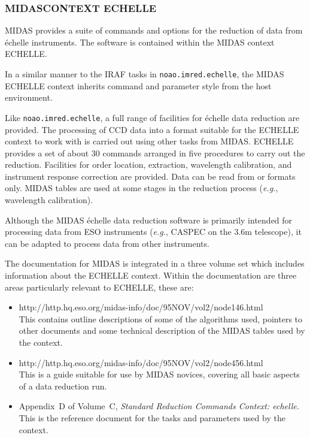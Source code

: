 \subsubsection{\label{se_midas_ech}MIDAS\sgspec{---}{ - }CONTEXT ECHELLE}

 MIDAS provides a suite of commands and
options for the reduction of data from \'{e}chelle instruments.
The software is contained within the MIDAS context ECHELLE\@.

In a similar manner to the IRAF tasks in {\tt noao.imred.echelle},
the MIDAS ECHELLE context inherits command and parameter style from
the host environment.

Like {\tt noao.imred.echelle}, a full range of facilities for \'{e}chelle
data reduction are provided.  The processing of CCD data into a format
suitable for the ECHELLE context to work with is carried out using other
tasks from MIDAS\@.  ECHELLE provides a set of about 30 commands arranged
in five procedures to carry out the reduction.  Facilities for order
location, extraction, wavelength calibration, and instrument response
correction are provided.  Data can be read from
 or  formats only.
MIDAS tables are used at some stages in the reduction process
({\em{e.g.}}, wavelength calibration).

Although the MIDAS \'{e}chelle data reduction software is primarily intended
for processing data from ESO instruments ({\em{e.g.}}, CASPEC on the 3.6m
telescope), it can be adapted to process data from other instruments.

The documentation for MIDAS is integrated in a three volume set which
includes information about the ECHELLE context.  Within the documentation
are three areas particularly relevant to ECHELLE, these are:

\begin{itemize}

\item {}
      {http://http.hq.eso.org/midas-info/doc/95NOV/vol2/node146.html}\\
      This contains outline descriptions of some of the algorithms used,
      pointers to other documents and some technical description of the
      MIDAS tables used by the context.

\item {}
      {http://http.hq.eso.org/midas-info/doc/95NOV/vol2/node456.html}\\
      This is a guide suitable for use by MIDAS novices, covering all
      basic aspects of a data reduction run.

\item Appendix~D of Volume~C, {\sl Standard Reduction Commands Context:
      echelle.}\\
      This is the reference document for the tasks and parameters used
      by the context.

\end{itemize}

